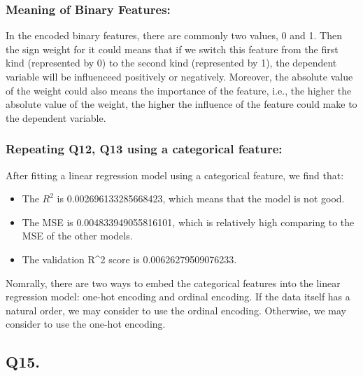 \documentclass{article}
\begin{document}
\subsubsection*{Meaning of Binary Features:}

In the encoded binary features, there are commonly two values, 0 and 1. 
Then the sign weight for it could means that if we switch this feature from the first kind (represented by 0) to the second kind (represented by 1), the dependent variable will be influenceed positively or negatively.
Moreover, the absolute value of the weight could also means the importance of the feature, i.e., the higher the absolute value of the weight, the higher the influence of the feature could make to the dependent variable.

\subsubsection*{Repeating Q12, Q13 using a categorical feature:}

After fitting a linear regression model using a categorical feature, we find that:

\begin{itemize}
    \item The $R^2$ is 0.002696133285668423, which means that the model is not good.
    \item The MSE is 0.004833949055816101, which is relatively high comparing to the MSE of the other models.
    \item The validation R^2 score is 0.00626279509076233.
\end{itemize}

Nomrally, there are two ways to embed the categorical features into the linear regression model: one-hot encoding and ordinal encoding. If the data itself has a natural order, we may consider to use the ordinal encoding. Otherwise, we may consider to use the one-hot encoding. 

\subsection*{Q15.}
\end{document}
